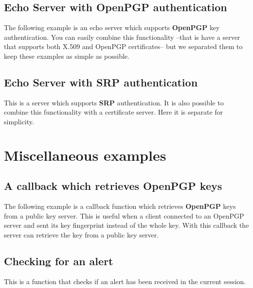 \subsection{Echo Server with OpenPGP authentication}
The following example is an echo server which supports {\bf OpenPGP} key 
authentication. You can easily combine this functionality --that is have
a server that supports both X.509 and OpenPGP certificates-- but we
separated them to keep these examples as simple as possible.



\subsection{Echo Server with SRP authentication}
This is a server which supports {\bf SRP} authentication. It is also
possible to combine this functionality with a certificate server. Here it
is separate for simplicity.


\section{Miscellaneous examples}

\subsection{A callback which retrieves OpenPGP keys}
The following example is a callback function which retrieves {\bf OpenPGP} keys from
a public key server. This is useful when a client connected to an OpenPGP \tls{} server
and sent its key fingerprint instead of the whole key. With this callback the \tls{}
server can retrieve the key from a public key server.


\subsection{Checking for an alert}
This is a function that checks if an alert has been received
in the current session.



